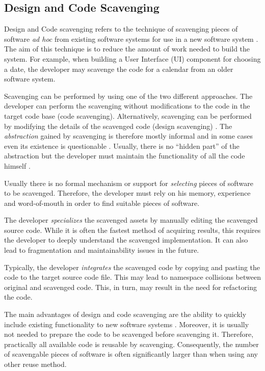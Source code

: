 \subsection{Design and Code Scavenging}

Design and Code scavenging refers to the technique of scavenging pieces of software \emph{ad hoc} from existing software systems for use in a new software system  \citep[chap.~4]{krueger_software_1992}. The aim of this technique is to reduce the amount of work needed to build the system. For example, when building a User Interface (UI) component for choosing a date, the developer may scavenge the code for a calendar from an older software system.

Scavenging can be performed by using one of the two different approaches. The developer can perform the scavenging without modifications to the code in the target code base (code scavenging). Alternatively, scavenging can be performed by modifying the details of the scavenged code (design scavenging) \citep[chap.~4]{krueger_software_1992}. The \emph{abstraction} gained by scavenging is therefore mostly informal and in some cases even its existence is questionable \citep[chap.~3]{sametinger_software_1997}. Usually, there is no ``hidden part'' of the abstraction but the developer must maintain the functionality of all the code himself \citep[chap.~3]{sametinger_software_1997}.

Usually there is no formal mechanism or support for \emph{selecting} pieces of software to be scavenged. Therefore, the developer must rely on his memory, experience and word-of-mouth in order to find suitable pieces of software. \citep[chap.~3]{sametinger_software_1997}

The developer \emph{specializes} the scavenged assets by manually editing the scavenged source code. While it is often the fastest method of acquiring results, this requires the developer to deeply understand the scavenged implementation. It can also lead to fragmentation and maintainability issues in the future. \citep[chap.~4]{krueger_software_1992}

Typically, the developer \emph{integrates} the scavenged code by copying and pasting the code to the target source code file. This may lead to namespace collisions between original and scavenged code. This, in turn, may result in the need for refactoring the code. \citep[chap.~4]{krueger_software_1992}

The main advantages of design and code scavenging are the ability to quickly include existing functionality to new software systems \citep[chap.~4]{krueger_software_1992}. Moreover, it is usually not needed to prepare the code to be scavenged before scavenging it. Therefore, practically all available code is reusable by scavenging. Consequently, the number of scavengable pieces of software is often significantly larger than when using any other reuse method. 

